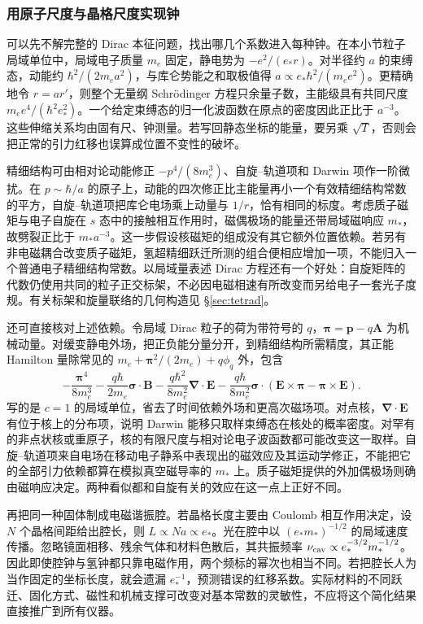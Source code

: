 \subsubsection{用原子尺度与晶格尺度实现钟}

可以先不解完整的 Dirac 本征问题，找出哪几个系数进入每种钟。在本小节粒子局域单位中，局域电子质量 $m_e$ 固定，静电势为 $-e^2/(e_*r)$。对半径约 $a$ 的束缚态，动能约 $\hbar^2/(2m_ea^2)$，与库仑势能之和取极值得 $a\propto e_*\hbar^2/(m_ee^2)$。更精确地令 $r=ar'$，则整个无量纲 Schrödinger 方程只余量子数，主能级具有共同尺度 $m_e e^4/(\hbar^2 e_*^2)$。一个给定束缚态的归一化波函数在原点的密度因此正比于 $a^{-3}$。这些伸缩关系均由固有尺、钟测量。若写回静态坐标的能量，要另乘 $\sqrt T$，否则会把正常的引力红移也误算成位置不变性的破坏。

精细结构可由相对论动能修正 $-p^4/(8m_e^3)$、自旋--轨道项和 Darwin 项作一阶微扰。在 $p\sim\hbar/a$ 的原子上，动能的四次修正比主能量再小一个有效精细结构常数的平方，自旋--轨道项把库仑电场乘上动量与 $1/r$，恰有相同的标度。考虑质子磁矩与电子自旋在 $s$ 态中的接触相互作用时，磁偶极场的能量还带局域磁响应 $m_*$，故劈裂正比于 $m_*a^{-3}$。这一步假设核磁矩的组成没有其它额外位置依赖。若另有非电磁耦合改变质子磁矩，氢超精细跃迁所测的组合便相应增加一项，不能归入一个普通电子精细结构常数。以局域量表述 Dirac 方程还有一个好处：自旋矩阵的代数仍使用共同的粒子正交标架，不必因电磁相速有所改变而另给电子一套光子度规。有关标架和旋量联络的几何构造见 \S\ref{sec:tetrad}。

还可直接核对上述依赖。令局域 Dirac 粒子的荷为带符号的 $q$，$\bm\pi=\bm p-q\bm A$ 为机械动量。对缓变静电外场，把正负能分量分开，到精细结构所需精度，其正能 Hamilton 量除常见的 $m_e+\bm\pi^2/(2m_e)+q\phi_q$ 外，包含
\[
 -\frac{\bm\pi^4}{8m_e^3}
 -\frac{q\hbar}{2m_e}\bm\sigma\cdot\bm B
 -\frac{q\hbar^2}{8m_e^2}\bm\nabla\cdot\bm E
 -\frac{q\hbar}{8m_e^2}
       \bm\sigma\cdot(\bm E\times\bm\pi-\bm\pi\times\bm E).
\]
写的是 $c=1$ 的局域单位，省去了时间依赖外场和更高次磁场项。对点核，$\bm\nabla\cdot\bm E$ 有位于核上的分布项，说明 Darwin 能移只取样束缚态在核处的概率密度。对罕有的非点状核或重原子，核的有限尺度与相对论电子波函数都可能改变这一取样。自旋--轨道项来自电场在移动电子静系中表现出的磁效应及其运动学修正，不能把它的全部引力依赖都算在模拟真空磁导率的 $m_*$ 上。质子磁矩提供的外加偶极场则确由磁响应决定。两种看似都和自旋有关的效应在这一点上正好不同。

再把同一种固体制成电磁谐振腔。若晶格长度主要由 Coulomb 相互作用决定，设 $N$ 个晶格间距给出腔长，则 $L\propto Na\propto e_*$。光在腔中以 $(e_*m_*)^{-1/2}$ 的局域速度传播。忽略镜面相移、残余气体和材料色散后，其共振频率 $\nu_{\rm cav}\propto e_*^{-3/2}m_*^{-1/2}$。因此即使腔钟与氢钟都只靠电磁作用，两个频标的幂次也相当不同。若把腔长人为当作固定的坐标长度，就会遗漏 $e_*^{-1}$，预测错误的红移系数。实际材料的不同跃迁、固化方式、磁性和机械支撑可改变对基本常数的灵敏性，不应将这个简化结果直接推广到所有仪器。

